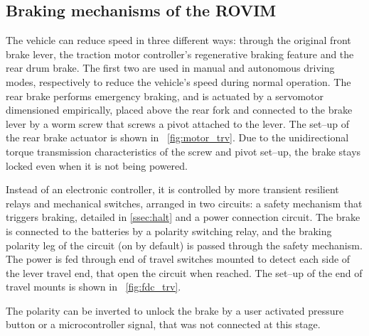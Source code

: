 \documentclass[journal]{IEEEtran}
\begin{document}
\subsection{Braking mechanisms of the ROVIM}

The vehicle can reduce speed in three different ways: through the original front brake lever, the traction motor controller's regenerative braking feature and the rear drum brake. The first two are used in manual and autonomous driving modes, respectively to reduce the vehicle's speed during normal operation. The rear brake performs emergency braking, and is actuated by a servomotor dimensioned empirically, placed above the rear fork and connected to the brake lever by a worm screw that screws a pivot attached to the lever. The set--up of the rear brake actuator is shown in \figurename~\ref{fig:motor_trv}. Due to the unidirectional torque transmission characteristics of the screw and pivot set--up, the brake stays locked even when it is not being powered.

Instead of an electronic controller, it is controlled by more transient resilient relays and mechanical switches, arranged in two circuits: a safety mechanism that triggers braking, detailed in \ref{ssec:halt} and a power connection circuit. The brake is connected to the batteries by a polarity switching relay, and the braking polarity leg of the circuit (on by default) is passed through the safety mechanism. The power is fed through end of travel switches mounted to detect each side of the lever travel end, that open the circuit when reached. The set--up of the end of travel mounts is shown in \figurename~\ref{fig:fdc_trv}.

The polarity can be inverted to unlock the brake by a user activated pressure button or a microcontroller signal, that was not connected at this stage.
\end{document}

